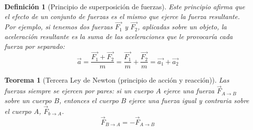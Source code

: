 \documentclass[12pt,a4paper]{article}
\newtheorem{mydef}{Definici\'on}[section]
\newtheorem{theorem}{Teorema}[section]
\begin{document}
\begin{mydef}[Principio de superposici\'on de fuerzas]
Este principio afirma que el efecto de un conjunto de fuerzas es el
mismo que ejerce la fuerza resultante.
Por ejemplo, si tenemos dos fuerzas \(\vec{F_1}\) y \(\vec{F_2}\),
aplicadas sobre un objeto, la aceleraci\'on resultante es la suma de
las aceleraciones que le provocar\'ia cada fuerza por separado:
\[\vec{a}=\frac{\vec{F_1}+\vec{F_2}}{m}=\frac{\vec{F_1}}{m}+\frac{\vec{F_2}}{m}= \vec{a_1}+\vec{a_2}\]
\end{mydef}

\begin{theorem}[Tercera Ley de Newton (principio de acci\'on y reacci\'on)]
Las fuerzas siempre se ejercen por pares: si un cuerpo \(A\) ejerce
una fuerza \(\vec{F}_{A \to B}\) sobre un cuerpo \(B\), entonces el
cuerpo \(B\) ejerce una fuerza igual y contraria sobre el cuerpo
\(A\), \(\vec{F}_{b \to A}\).
\[\vec{F}_{B \to A} = -\vec{F}_{A \to B}\]

\end{theorem}
\end{document}
